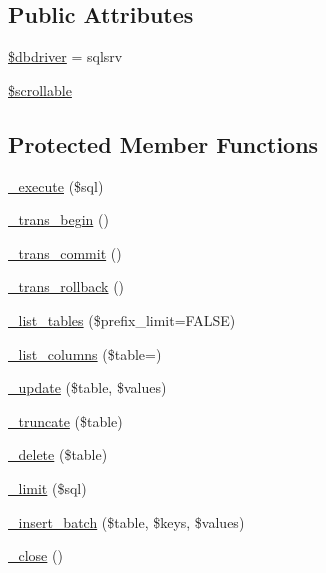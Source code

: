 \subsection*{Public Attributes}
\begin{DoxyCompactItemize}
\item 
\mbox{\hyperlink{class_c_i___d_b__sqlsrv__driver_a0cde2a16322a023d040aa7f725877597}{\$dbdriver}} = \textquotesingle{}sqlsrv\textquotesingle{}
\item 
\mbox{\hyperlink{class_c_i___d_b__sqlsrv__driver_a76095eacf021915db9aabc44ecf58555}{\$scrollable}}
\end{DoxyCompactItemize}
\subsection*{Protected Member Functions}
\begin{DoxyCompactItemize}
\item 
\mbox{\hyperlink{class_c_i___d_b__sqlsrv__driver_a114ab675d89bf8324a41785fb475e86d}{\+\_\+execute}} (\$sql)
\item 
\mbox{\hyperlink{class_c_i___d_b__sqlsrv__driver_ac81ac882c1d54347d810199a15856aac}{\+\_\+trans\+\_\+begin}} ()
\item 
\mbox{\hyperlink{class_c_i___d_b__sqlsrv__driver_a6fe7f373e0b11cfae23a5f41c0b35dda}{\+\_\+trans\+\_\+commit}} ()
\item 
\mbox{\hyperlink{class_c_i___d_b__sqlsrv__driver_ad49a116b0776c26b53114c9093fd102a}{\+\_\+trans\+\_\+rollback}} ()
\item 
\mbox{\hyperlink{class_c_i___d_b__sqlsrv__driver_a435c0f3ce54fe7daa178baa8532ebd54}{\+\_\+list\+\_\+tables}} (\$prefix\+\_\+limit=F\+A\+L\+SE)
\item 
\mbox{\hyperlink{class_c_i___d_b__sqlsrv__driver_a7ccb7f9c301fe7f0a9db701254142b63}{\+\_\+list\+\_\+columns}} (\$table=\textquotesingle{}\textquotesingle{})
\item 
\mbox{\hyperlink{class_c_i___d_b__sqlsrv__driver_a2540b03a93fa73ae74c10d0e16fc073e}{\+\_\+update}} (\$table, \$values)
\item 
\mbox{\hyperlink{class_c_i___d_b__sqlsrv__driver_aa029600528fc1ce660a23ff4b4667f95}{\+\_\+truncate}} (\$table)
\item 
\mbox{\hyperlink{class_c_i___d_b__sqlsrv__driver_a133ea8446ded52589bd22cc9163d0896}{\+\_\+delete}} (\$table)
\item 
\mbox{\hyperlink{class_c_i___d_b__sqlsrv__driver_a3a02ea06541b8ecc25a33a61651562c8}{\+\_\+limit}} (\$sql)
\item 
\mbox{\hyperlink{class_c_i___d_b__sqlsrv__driver_a1978e1358c812587a46e242630365099}{\+\_\+insert\+\_\+batch}} (\$table, \$keys, \$values)
\item 
\mbox{\hyperlink{class_c_i___d_b__sqlsrv__driver_a4d9082658000e5ede8312067c6dda9db}{\+\_\+close}} ()
\end{DoxyCompactItemize}
